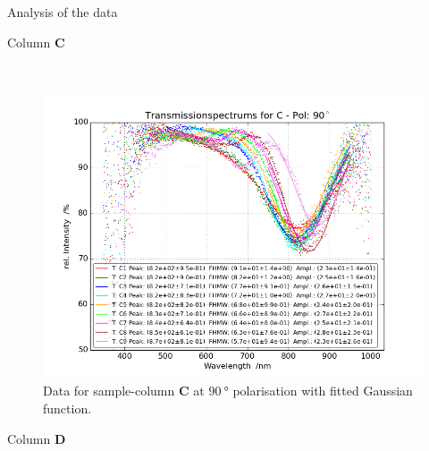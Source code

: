 \documentclass[pdftex, a4paper,11pt, twoside, UKenglish]{report}
\begin{document}
\begin{chapter}{Analysis of the data}
\begin{section}{Column \textbf{C}}
\begin{figure}[ht!]
\begin{minipage}{.95\textwidth}
          \label{fig:TransspecFIT_CPol0}
        \end{minipage}\\
        \begin{minipage}{.95\textwidth}
          \centering
          \includegraphics[width=\textwidth]
              {Figures/TransspecFIT_CPol90.png}
          \caption{Data for sample-column \textbf{C} at $\SI{90}{\degree}$
              polarisation with fitted Gaussian function.}
          \label{fig:TransspecFIT_CPol90}
        \end{minipage}
      \end{figure}
      
    \end{section}
    
    
    
    \newpage
    \begin{section}{Column \textbf{D}}
      \label{chp::DataD}
      
      

\end{section}
\end{chapter}
\end{document}
